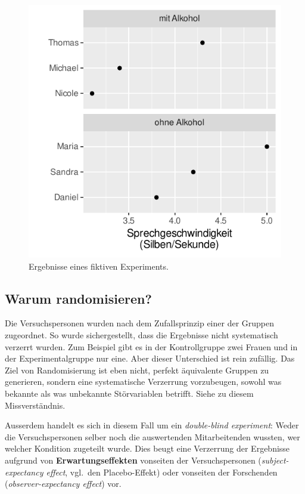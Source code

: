 \documentclass[oneside, 10pt]{book}\usepackage[]{graphicx}\usepackage[]{xcolor}
\newenvironment{knitrout}{}{} %
\begin{document}
\begin{knitrout}
\color{fgcolor}\begin{figure}[tp]

{\centering \includegraphics[width=.5\textwidth]{figs/unnamed-chunk-345-1} 

}

\caption{Ergebnisse eines fiktiven Experiments.\label{fig:experiment}}\label{fig:unnamed-chunk-345}
\end{figure}

\end{knitrout}

\subsection{Warum randomisieren?}
Die Versuchspersonen wurden nach dem Zufallsprinzip einer
der Gruppen zugeordnet. So wurde sichergestellt, dass die
Ergebnisse nicht systematisch verzerrt wurden.
Zum Beispiel gibt es in der Kontrollgruppe zwei Frauen
und in der Experimentalgruppe nur eine. Aber dieser
Unterschied ist rein zufällig. Das Ziel von
Randomisierung ist eben nicht, perfekt
äquivalente Gruppen zu generieren, sondern
eine systematische Verzerrung vorzubeugen, sowohl
was bekannte als was unbekannte Störvariablen betrifft.
Siehe \citet{Vanhove2015} zu diesem Missverständnis.

Ausserdem handelt es sich in diesem Fall um ein
\textit{double-blind experiment}: Weder die Versuchspersonen
selber noch die auswertenden Mitarbeitenden wussten, wer welcher
Kondition zugeteilt wurde. Dies beugt eine Verzerrung
der Ergebnisse aufgrund von \textbf{Erwartungseffekten} vonseiten
der Versuchspersonen (\textit{subject-expectancy effect}, vgl.\ den
Placebo-Effekt) oder vonseiten der Forschenden (\textit{observer-expectancy effect}) vor.
\end{document}
